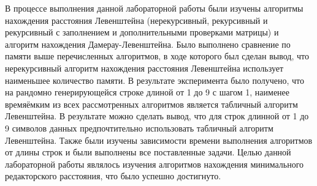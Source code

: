 \Conclusion
В процессе выполнения данной лабораторной работы были изучены алгоритмы нахождения расстояния Левенштейна (нерекурсивный, рекурсивный и рекурсивный с заполнением и дополнительными проверками матрицы) и алгоритм нахождения Дамерау-Левенштейна. Было выполнено сравнение по памяти выше перечисленных алгоритмов, в ходе которого был сделан вывод, что нерекурсивный алгоритм нахождения расстояния Левенштейна использует наименьшее количество памяти. В результате эксперимента было получено, что на рандомно генерирующейся строке длиной от 1 до 9 с шагом 1, наименее времяёмким из всех рассмотренных алгоритмов является табличный алгоритм Левенштейна. В результате можно сделать вывод, что для строк длинной от 1 до 9 символов данных предпочтительно использовать табличный алгоритм Левенштейна. Также были изучены зависимости времени выполнения алгоритмов от длины строк и были выполнены все поставленные задачи. Целью данной лабораторной работы являлось изучения алгоритмов нахождения минимального редакторского расстояния, что было успешно достигнуто. 